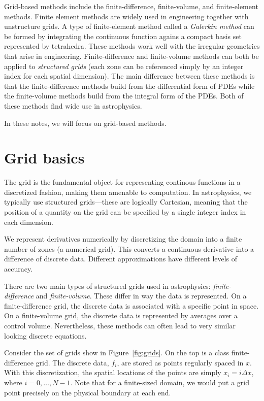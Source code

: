 Grid-based methods include the finite-difference, finite-volume, and
finite-element methods.  Finite element methods are widely used in
engineering together with unstructure grids.  A type of finite-element
method called a {\em Galerkin method} can be formed by integrating the
continuous function agains a compact basis set represented by
tetrahedra.  These methods work well with the irregular geometries
that arise in engineering.  Finite-difference and finite-volume
methods can both be applied to {\em structured grids} (each zone can
be referenced simply by an integer index for each spatial dimension).
The main difference between these methods is that the
finite-difference methods build from the differential form of PDEs
while the finite-volume methods build from the integral form of the
PDEs.  Both of these methods find wide use in astrophysics.

In these notes, we will focus on grid-based methods.


\section{Grid basics}

The grid is the fundamental object for representing continous
functions in a discretized fashion, making them amenable to
computation.  In astrophysics, we typically use structured
grids---these are logically Cartesian, meaning that the position of a
quantity on the grid can be specified by a single integer index in
each dimension.  

We represent derivatives numerically by discretizing the domain into
a finite number of zones (a numerical grid).
This converts a continuous derivative into a difference of discrete data.  
Different approximations have different levels of accuracy.  

There are two main types of structured grids used in astrophysics:
{\em finite-difference} and {\em finite-volume}.  These differ in way
the data is represented.  On a finite-difference grid, the discrete
data is associated with a specific point in space.  On a
finite-volume grid, the discrete data is represented by averages over
a control volume.  Nevertheless, these methods can often lead to very
similar looking discrete equations.

Consider the set of grids show in Figure~\ref{fig:grids}.  On the top
is a class finite-difference grid.  The discrete data, $f_i$, are
stored as points regularly spaced in $x$.  With this discretization,
the spatial locations of the points are simply $x_i = i \Delta x$,
where $i = 0, \ldots, N-1$.  Note that for a finite-sized domain, we
would put a grid point precisely on the physical boundary at each end.

